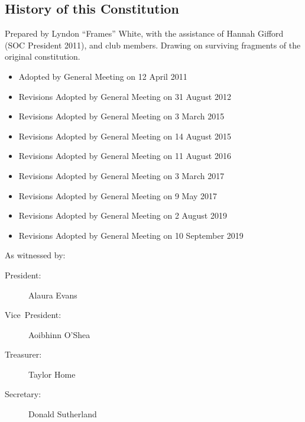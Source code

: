 \documentclass[a4paper]{article}
\begin{document}
\begin{appendices}

    \section{History of this Constitution} \label{sec:app:history}

    \noindent Prepared by Lyndon ``Frames'' White, with the assistance of Hannah Gifford (SOC President 2011), and club members. Drawing on surviving fragments of the original constitution.

    \medskip{}

    \begin{itemize}[label={}]
        \item Adopted by General Meeting on 12 April 2011
        \item Revisions Adopted by General Meeting on 31 August 2012
        \item Revisions Adopted by General Meeting on 3 March 2015
        \item Revisions Adopted by General Meeting on 14 August 2015
        \item Revisions Adopted by General Meeting on 11 August 2016
        \item Revisions Adopted by General Meeting on 3 March 2017
        \item Revisions Adopted by General Meeting on 9 May 2017
        \item Revisions Adopted by General Meeting on 2 August 2019
        \item Revisions Adopted by General Meeting on 10 September 2019
    \end{itemize}

    \medskip{}

    \noindent As witnessed by:
    \begin{description}
        \item[{President:}] Alaura Evans
        \item[{Vice~President:}] Aoibhinn O'Shea
        \item[{Treasurer:}] Taylor Home
        \item[{Secretary:}] Donald Sutherland
    \end{description}

\end{appendices}
\end{document}
